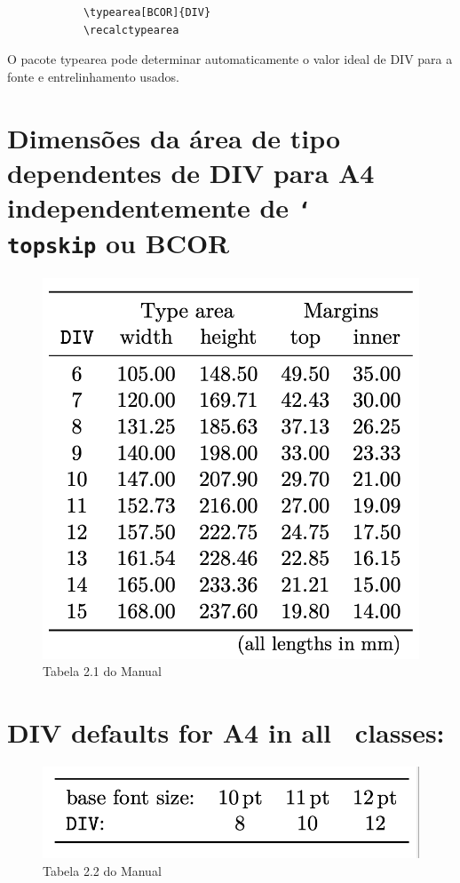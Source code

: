 \begin{verbatim}
            \typearea[BCOR]{DIV}
            \recalctypearea
\end{verbatim}


O pacote typearea pode determinar automaticamente o valor ideal de DIV para a fonte e entrelinhamento usados.

\section{Dimensões da área de tipo dependentes de DIV para A4 independentemente de \texttt{\char`\\topskip} ou BCOR}


\begin{figure}[ht]
    \centering
    \includegraphics[width=0.45\linewidth]{tab2_1.png}
    \caption{Tabela 2.1 do Manual}
    \label{fig:tab2_1l}
\end{figure}

\section{DIV defaults for A4 in all \KOMAScript\ classes:}
\begin{figure}[hb]
    \centering
    \includegraphics[width=0.5\linewidth]{tab2_2.png}
    \caption{Tabela 2.2 do Manual}
    \label{fig:tab2_2}
\end{figure}

